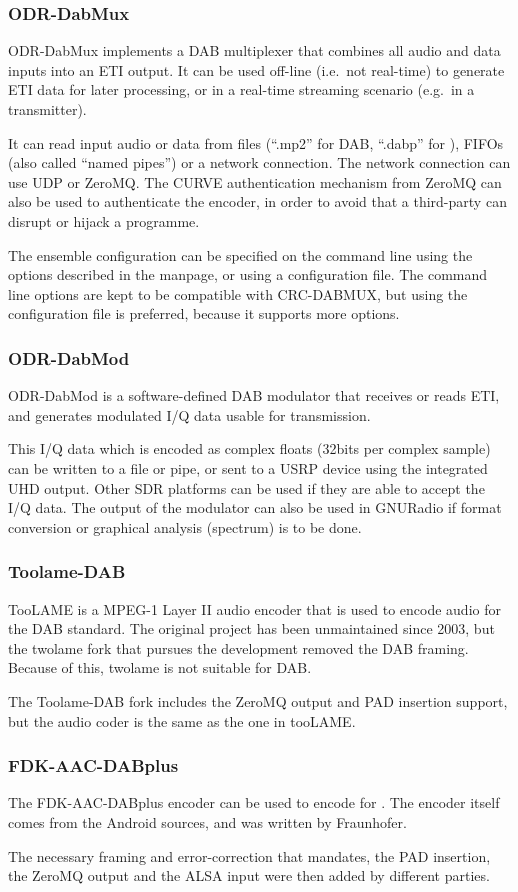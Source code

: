 \subsubsection{ODR-DabMux}
ODR-DabMux implements a DAB multiplexer that combines all audio and data inputs
into an ETI output. It can be used off-line (i.e.~not real-time) to generate ETI
data for later processing, or in a real-time streaming scenario (e.g.~in a
transmitter).

It can read input audio or data from files (``.mp2'' for DAB, ``.dabp'' for
\dabplus), FIFOs (also called ``named pipes'') or a network connection. The
network connection can use UDP or ZeroMQ. The CURVE authentication mechanism
from ZeroMQ can also be used to authenticate the encoder, in order to avoid that
a third-party can disrupt or hijack a programme.

The ensemble configuration can be specified on the command line using the
options described in the manpage, or using a configuration file. The command
line options are kept to be compatible with CRC-DABMUX, but using the
configuration file is preferred, because it supports more options.


\subsubsection{ODR-DabMod}
ODR-DabMod is a software-defined DAB modulator that receives or reads ETI, and
generates modulated I/Q data usable for transmission.

This I/Q data which is encoded as complex floats (32bits per complex sample) can
be written to a file or pipe, or sent to a USRP device using the integrated UHD
output. Other SDR platforms can be used if they are able to accept the I/Q data.
The output of the modulator can also be used in GNURadio if format conversion or
graphical analysis (spectrum) is to be done.

\subsubsection{Toolame-DAB}
TooLAME is a MPEG-1 Layer II audio encoder that is used to encode audio for the
DAB standard. The original project has been unmaintained since 2003, but the
twolame fork that pursues the development removed the DAB framing. Because of
this, twolame is not suitable for DAB.

The Toolame-DAB fork includes the ZeroMQ output and PAD insertion support, but
the audio coder is the same as the one in tooLAME.

\subsubsection{FDK-AAC-DABplus}
The FDK-AAC-DABplus encoder can be used to encode for \dabplus. The encoder
itself comes from the Android sources, and was written by Fraunhofer.

The necessary framing and error-correction that \dabplus mandates, the PAD
insertion, the ZeroMQ output and the ALSA input were then added by different
parties.



